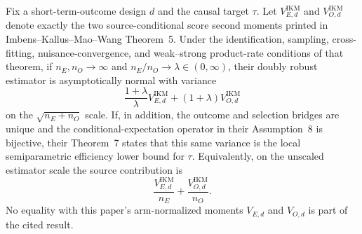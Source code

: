 Fix a short-term-outcome design \(d\) and the causal target \(\tau\).  Let \(V_{E,d}^{\mathrm{IKM}}\) and \(V_{O,d}^{\mathrm{IKM}}\) denote exactly the two source-conditional score second moments printed in Imbens--Kallus--Mao--Wang Theorem~5.  Under the identification, sampling, cross-fitting, nuisance-convergence, and weak--strong product-rate conditions of that theorem, if \(n_E,n_O\to\infty\) and \(n_E/n_O\to\lambda\in(0,\infty)\), their doubly robust estimator is asymptotically normal with variance
\[
 \frac{1+\lambda}{\lambda}V_{E,d}^{\mathrm{IKM}}
 +(1+\lambda)V_{O,d}^{\mathrm{IKM}}
\]
on the \(\sqrt{n_E+n_O}\) scale.  If, in addition, the outcome and selection bridges are unique and the conditional-expectation operator in their Assumption~8 is bijective, their Theorem~7 states that this same variance is the local semiparametric efficiency lower bound for \(\tau\).  Equivalently, on the unscaled estimator scale the source contribution is
\[
 \frac{V_{E,d}^{\mathrm{IKM}}}{n_E}
 +\frac{V_{O,d}^{\mathrm{IKM}}}{n_O}.
\]
No equality with this paper's arm-normalized moments \(V_{E,d}\) and \(V_{O,d}\) is part of the cited result.
